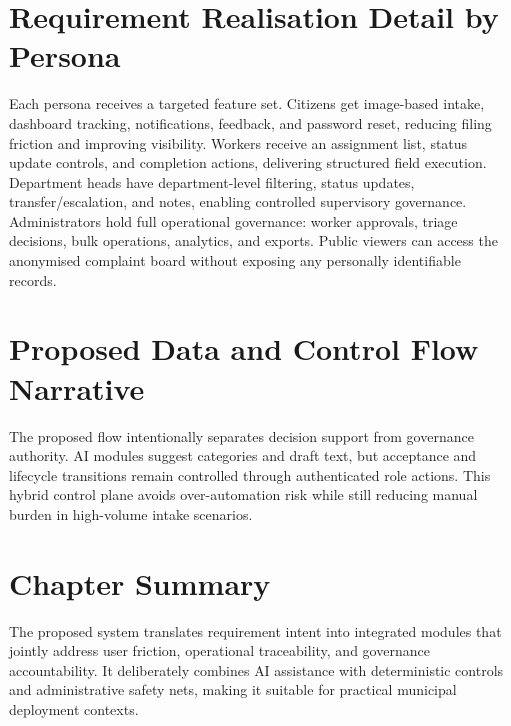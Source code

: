 \section{Requirement Realisation Detail by Persona}

Each persona receives a targeted feature set. Citizens get image-based intake, dashboard tracking, notifications, feedback, and password reset, reducing filing friction and improving visibility. Workers receive an assignment list, status update controls, and completion actions, delivering structured field execution. Department heads have department-level filtering, status updates, transfer/escalation, and notes, enabling controlled supervisory governance. Administrators hold full operational governance: worker approvals, triage decisions, bulk operations, analytics, and exports. Public viewers can access the anonymised complaint board without exposing any personally identifiable records.

\section{Proposed Data and Control Flow Narrative}

The proposed flow intentionally separates decision support from governance authority. AI modules suggest categories and draft text, but acceptance and lifecycle transitions remain controlled through authenticated role actions. This hybrid control plane avoids over-automation risk while still reducing manual burden in high-volume intake scenarios.

\section{Chapter Summary}

The proposed system translates requirement intent into integrated modules that jointly address user friction, operational traceability, and governance accountability. It deliberately combines AI assistance with deterministic controls and administrative safety nets, making it suitable for practical municipal deployment contexts.

